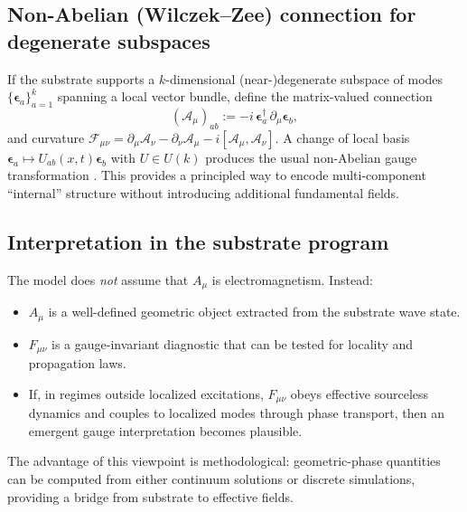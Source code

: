 \subsection{Non-Abelian (Wilczek--Zee) connection for degenerate subspaces}

If the substrate supports a $k$-dimensional (near-)degenerate subspace of modes
$\{\bm{\epsilon}_a\}_{a=1}^k$ spanning a local vector bundle, define the matrix-valued connection
\begin{equation}
  (\mathcal{A}_\mu)_{ab} := -i\,\bm{\epsilon}_a^\dagger\,\partial_\mu \bm{\epsilon}_b,
  \label{eq:wz-connection}
\end{equation}
and curvature $\mathcal{F}_{\mu\nu}=\partial_\mu\mathcal{A}_\nu-\partial_\nu\mathcal{A}_\mu-i[\mathcal{A}_\mu,\mathcal{A}_\nu]$.
A change of local basis $\bm{\epsilon}_a\mapsto U_{ab}(x,t)\bm{\epsilon}_b$ with $U\in U(k)$ produces the
usual non-Abelian gauge transformation \citep{WilczekZee1984}.
This provides a principled way to encode multi-component ``internal'' structure without introducing
additional fundamental fields.

\subsection{Interpretation in the substrate program}

The model does \emph{not} assume that $A_\mu$ is electromagnetism. Instead:
\begin{itemize}
\item $A_\mu$ is a well-defined geometric object extracted from the substrate wave state.
\item $F_{\mu\nu}$ is a gauge-invariant diagnostic that can be tested for locality and propagation laws.
\item If, in regimes outside localized excitations, $F_{\mu\nu}$ obeys effective sourceless dynamics
and couples to localized modes through phase transport, then an emergent gauge interpretation becomes plausible.
\end{itemize}

The advantage of this viewpoint is methodological: geometric-phase quantities can be computed from
either continuum solutions or discrete simulations, providing a bridge from substrate to effective fields.
